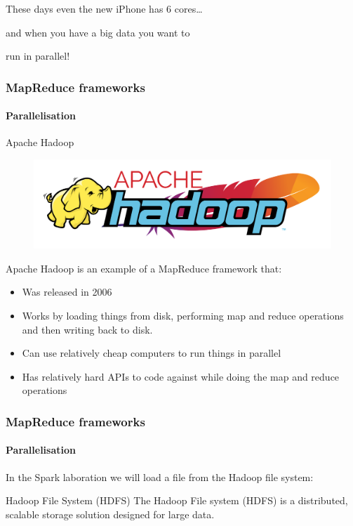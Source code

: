 \documentclass[aspectratio=169,usenames,dvipsnames]{beamer}
\begin{document}
{\begin{frame}[plain]
\begin{center}
            \Large These days even the new iPhone has 6 cores\ldots 
            
            \vspace{0.05\textheight}

            \normalsize and when you have a big data you want to\pause
            
            \vspace{0.1\textheight}
            
            \Huge run in parallel!
        \end{center}
    \end{frame}
}
       
    \begin{frame}
        \frametitle{MapReduce frameworks}
        \framesubtitle{Parallelisation}
        \begin{block}{Apache Hadoop}
        \begin{figure}
        \vspace{-1.2\baselineskip}
        \includegraphics[width=1\linewidth]{figures/hadoop.png}
        \end{figure}
        Apache Hadoop is an example of a MapReduce framework that:
        \begin{itemize}
            \item Was \alert{released in 2006}
            \item Works by loading things \alert{from disk}, performing map and reduce operations and then \alert{writing back to disk}.
            \item Can use relatively \alert{cheap computers} to run things in \alert{parallel}
            \item Has relatively \alert{hard APIs to code against} while doing the map and reduce operations
        \end{itemize}
        \end{block}
    \end{frame}

    \begin{frame}
        \frametitle{MapReduce frameworks}
        \framesubtitle{Parallelisation}
        \centering
        In the Spark laboration we will load a file from the Hadoop file system:
        \begin{block}{Hadoop File System (HDFS)}
            The Hadoop File system (HDFS) is a \alert{distributed},
            \alert{scalable} storage solution designed for large data.
        \end{block}
    \end{frame}
    
\end{document}
